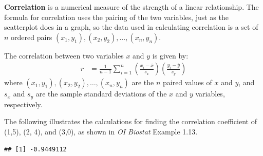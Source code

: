 \textbf{Correlation} is a numerical measure of the strength of a linear relationship. The formula for correlation uses the pairing of the two variables, just as the scatterplot does in a graph, so the data used in calculating correlation is a set of $n$ ordered pairs $(x_1,y_1), (x_2,y_2), \ldots, (x_n, y_n) $.

The correlation between two variables $x$ and $y$ is given by:
		\begin{align*}
          r &=  \frac{1}{n-1}\sum^{n}_{i=1}
          \left(\frac{x_{i}-\overline{x}}
          {s_{x}}\right)\left(\frac{y_{i}-\overline{y}}{s_{y}}\right)
    \end{align*}      
where $(x_1,y_1), (x_2,y_2), \ldots, (x_n, y_n)$ are the $n$ paired values of $x$ and $y$, and $s_x$ and $s_y$ are the sample standard deviations of the $x$ and $y$ variables, respectively.     

The following illustrates the calculations for finding the correlation coefficient of (1,5), (2, 4), and (3,0), as shown in \textit{OI Biostat} Example 1.13.

\begin{knitrout}
\color{fgcolor}\begin{kframe}
\begin{alltt}
 \hlkwb{=} \hlstd{(}\hlstd{,} \hlstd{,} \hlstd{)}
 \hlkwb{=} \hlstd{(}\hlstd{,} \hlstd{,} \hlstd{)}

 \hlkwb{=} 
 \hlkwb{=} 

 \hlkwb{=} 
 \hlkwb{=} 

 \hlkwb{=}  \hlopt{-} \hlopt{/}
 \hlkwb{=}  \hlopt{-} \hlopt{/}
 \hlkwb{=}  \hlopt{*} 
 \hlkwb{=} 

 \hlkwb{=}    
 \hlkwb{=}  \hlopt{/}  \hlopt{-} \hlstd{)}
\end{alltt}
\begin{verbatim}
## [1] -0.9449112
\end{verbatim}
\end{kframe}
\end{knitrout}

